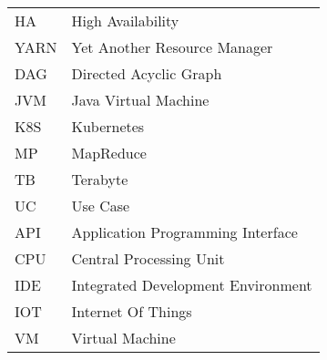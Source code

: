 \begin{longtable}{p{3cm}p{10cm}}
    HA&High Availability\\
    YARN&Yet Another Resource Manager\\
    DAG&Directed Acyclic Graph \\
    JVM&Java Virtual Machine\\
    K8S&Kubernetes\\
    MP&MapReduce \\
    TB&Terabyte\\
    UC&Use Case\\
API&Application Programming Interface\\
CPU&Central Processing Unit\\
IDE&Integrated Development Environment\\
IOT&Internet Of Things\\
VM&Virtual Machine\\
\end{longtable}
\addtocounter{table}{-1} 